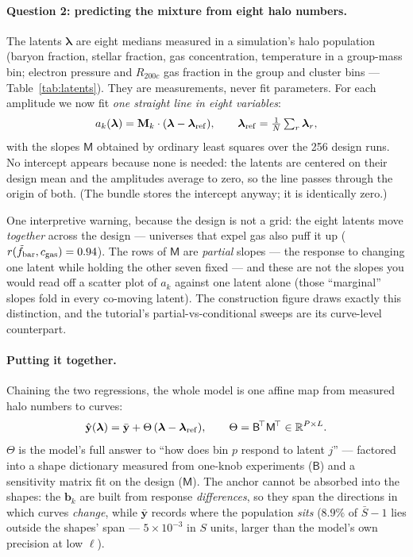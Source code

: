 \paragraph{Question 2: predicting the mixture from eight halo numbers.}
The latents $\boldsymbol{\lambda}$ are eight medians measured in a
simulation's halo population (baryon fraction, stellar fraction, gas
concentration, temperature in a group-mass bin; electron pressure and
$R_{200c}$ gas fraction in the group and cluster bins ---
Table~\ref{tab:latents}).  They are measurements, never fit parameters.
For each amplitude we now fit \emph{one straight line in eight
variables}:
\begin{equation}
a_k(\boldsymbol{\lambda})
= \mathbf{M}_k\cdot(\boldsymbol{\lambda}-\boldsymbol{\lambda}_{\rm ref}),
\qquad
\boldsymbol{\lambda}_{\rm ref}=\tfrac1N\textstyle\sum_r\boldsymbol{\lambda}_r ,
\label{eq:latmap}
\end{equation}
with the slopes $\mathsf{M}$ obtained by ordinary least squares over the
256 design runs.  No intercept appears because none is needed: the
latents are centered on their design mean and the amplitudes average to
zero, so the line passes through the origin of both.  (The bundle stores
the intercept anyway; it is identically zero.)

One interpretive warning, because the design is not a grid: the eight
latents move \emph{together} across the design --- universes that expel
gas also puff it up ($r(\tilde f_{\rm bar},c_{\rm gas})=0.94$).  The rows
of $\mathsf{M}$ are \emph{partial} slopes --- the response to changing
one latent while holding the other seven fixed --- and these are not the
slopes you would read off a scatter plot of $a_k$ against one latent
alone (those ``marginal'' slopes fold in every co-moving latent).  The
construction figure draws exactly this distinction, and the tutorial's
partial-vs-conditional sweeps are its curve-level counterpart.

\paragraph{Putting it together.}
Chaining the two regressions, the whole model is one affine map from
measured halo numbers to curves:
\begin{equation}
\hat{\mathbf{y}}(\boldsymbol{\lambda})
= \bar{\mathbf{y}}
+ \Theta\,(\boldsymbol{\lambda}-\boldsymbol{\lambda}_{\rm ref}),
\qquad
\Theta=\mathsf{B}^{\!\top}\mathsf{M}^{\!\top}\in\mathbb{R}^{P\times L}.
\label{eq:composed}
\end{equation}
$\Theta$ is the model's full answer to ``how does bin $p$ respond to
latent $j$'' --- factored into a shape dictionary measured from one-knob
experiments ($\mathsf{B}$) and a sensitivity matrix fit on the design
($\mathsf{M}$).  The anchor cannot be absorbed into the shapes: the
$\mathbf{b}_k$ are built from response \emph{differences}, so they span
the directions in which curves \emph{change}, while $\bar{\mathbf{y}}$
records where the population \emph{sits} ($8.9\%$ of $\bar S-1$ lies
outside the shapes' span --- $5\times10^{-3}$ in $S$ units, larger than
the model's own precision at low $\ell$).


